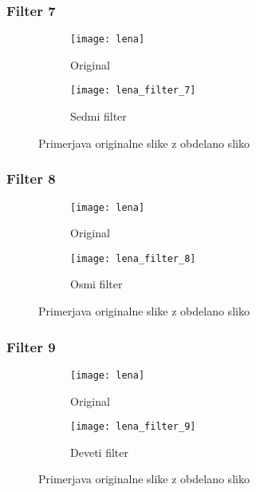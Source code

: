 \subsubsection*{Filter 7}
\begin{figure}[h]
    \centering
    \begin{subfigure}[b]{0.4\textwidth}
        \texttt{[image: lena]}
        \caption{Original}
    \end{subfigure}
    \begin{subfigure}[b]{0.4\textwidth}
        \texttt{[image: lena\_filter\_7]}
        \caption{Sedmi filter}
    \end{subfigure}
    \caption{Primerjava originalne slike z obdelano sliko}
    \label{fig:lena_filter_7}
\end{figure}


\subsubsection*{Filter 8}
\begin{figure}[h]
    \centering
    \begin{subfigure}[b]{0.4\textwidth}
        \texttt{[image: lena]}
        \caption{Original}
    \end{subfigure}
    \begin{subfigure}[b]{0.4\textwidth}
        \texttt{[image: lena\_filter\_8]}
        \caption{Osmi filter}
    \end{subfigure}
    \caption{Primerjava originalne slike z obdelano sliko}
    \label{fig:lena_filter_8}
\end{figure}


\subsubsection*{Filter 9}
\begin{figure}[h]
    \centering
    \begin{subfigure}[b]{0.4\textwidth}
        \texttt{[image: lena]}
        \caption{Original}
    \end{subfigure}
    \begin{subfigure}[b]{0.4\textwidth}
        \texttt{[image: lena\_filter\_9]}
        \caption{Deveti filter}
    \end{subfigure}
    \caption{Primerjava originalne slike z obdelano sliko}
    \label{fig:lena_filter_9}
\end{figure}


